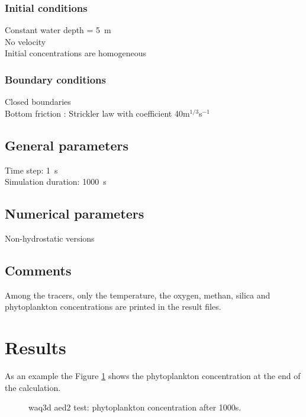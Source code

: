 \subsubsection{Initial conditions}
%
Constant water depth = 5~m\\
No velocity\\
Initial concentrations are homogeneous
%
\subsubsection{Boundary conditions}
%
Closed boundaries\\
Bottom friction : Strickler law with coefficient 40m$^{1/3}$s$^{-1}$
%
\subsection{General parameters}
%
Time step: 1~s\\
Simulation duration: 1000~s
%
%
%
\subsection{Numerical parameters}
%
Non-hydrostatic versions\\
%

%
\subsection{Comments}
Among the tracers, only the temperature, the oxygen, methan, silica and phytoplankton concentrations are printed in the result files.

%
%
\section{Results}

As an example the Figure \ref{fig:res} shows the phytoplankton concentration at the end of the calculation.
%

\begin{figure} [H]
\centering
{}
 \caption{waq3d aed2 test: phytoplankton concentration after 1000s.}
 \label{fig:res}
\end{figure}


